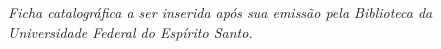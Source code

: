 %
%

\begin{fichacatalografica}
    \vspace*{\fill}
    \begin{center}
        \begin{minipage}{0.78\textwidth}
            \centering
            \textit{Ficha catalográfica a ser inserida após sua emissão pela Biblioteca da Universidade Federal do Espírito Santo.}
        \end{minipage}
    \end{center}
    \vspace*{\fill}
\end{fichacatalografica}
